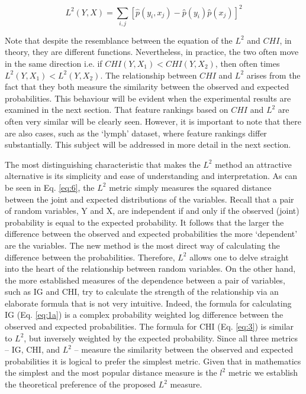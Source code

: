 \documentclass[review]{elsarticle}
\begin{document}
\begin{equation}\label{eq:6}
L^2 (Y,X)=\sum_{i,j} [ \hat{p}(y_i,x_j )-p ̂(y_i ) p ̂(x_j )]^2 
\end{equation}

Note that despite the resemblance between the equation of the $ L^2 $ and $ CHI $, in theory, they are different functions. Nevertheless, in practice, the two often move in the same direction i.e. if $ CHI(Y,X_1 ) < CHI(Y,X_2 ) $, then often times $  L^2 (Y,X_1 ) < L^2 (Y,X_2 ) $. The relationship between $ CHI $ and $ L^2 $ arises from the fact that they both measure the similarity between the observed and expected probabilities. This behaviour will be evident when the experimental results are examined in the next section. That feature rankings based on $ CHI $ and $ L^2 $ are often very similar will be clearly seen. However, it is important to note that there are also cases, such as the ‘lymph’ dataset, where feature rankings differ substantially. This subject will be addressed in more detail in the next section. 

The most distinguishing characteristic that makes the $ L^2 $ method an attractive alternative is its simplicity and ease of understanding and interpretation. As can be seen in Eq. \ref{eq:6}, the $ L^2 $ metric simply measures the squared distance between the joint and expected distributions of the variables. Recall that a pair of random variables,  Y and X, are independent if and only if the observed (joint) probability is equal to the expected probability. It follows that the larger the difference between the observed and expected probabilities the more ‘dependent’ are the variables. The new method is the most direct way of calculating the difference between the probabilities. Therefore, $ L^2 $ allows one to delve straight into the heart of the relationship between random variables.  On the other hand, the more established measures of the dependence between a pair of variables, such as IG and CHI, try to calculate the strength of the relationship via an elaborate formula that is not very intuitive. Indeed, the formula for calculating IG (Eq. \ref{eq:1a}) is a complex probability weighted log difference between the observed and expected probabilities. The formula for CHI (Eq. \ref{eq:3}) is similar to $ L^2 $, but inversely weighted by the expected probability. Since all three metrics – IG, CHI, and $ L^2 $ – measure the similarity between the observed and expected probabilities it is logical to prefer the simplest metric. Given that in mathematics the simplest and the most popular distance measure is the $ l^2 $ metric we establish the theoretical preference of the proposed $ L^2 $ measure.
\end{document}
